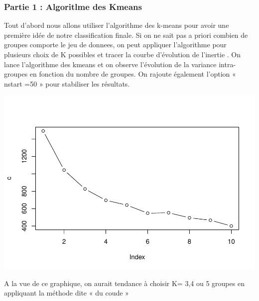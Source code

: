 \documentclass[
]{article}
\newenvironment{Shaded}{}{}
\newcommand{\AttributeTok}[1]{#1}
\newcommand{\DecValTok}[1]{#1}
\newcommand{\FunctionTok}[1]{#1}
\newcommand{\NormalTok}[1]{#1}
\newcommand{\OtherTok}[1]{\textcolor[rgb]{1.00,0.25,0.00}{#1}}
\newcommand{\SpecialCharTok}[1]{\textcolor[rgb]{0.00,0.50,0.50}{#1}}
\begin{document}
\hypertarget{partie-1-algoritlme-des-kmeans}{%
\subsubsection{Partie 1 : Algoritlme des
Kmeans}\label{partie-1-algoritlme-des-kmeans}}

Tout d'abord nous allons utiliser l'algorithme des k-means pour avoir
une première idée de notre classification finale. Si on ne sait pas a
priori combien de groupes comporte le jeu de donnees, on peut appliquer
l'algorithme pour plusieurs choix de K possibles et tracer la courbe
d'évolution de l'inertie . On lance l'algorithme des kmeans et on
observe l'évolution de la variance intra-groupes en fonction du nombre
de groupes. On rajoute également l'option « nstart =50 » pour stabiliser
les résultats.

\includegraphics{projet_classification_files/figure-latex/unnamed-chunk-9-1.pdf}

A la vue de ce graphique, on aurait tendance à choisir K= 3,4 ou 5
groupes en appliquant la méthode dite « du coude »

\begin{Shaded}
\end{Shaded}
\end{document}
